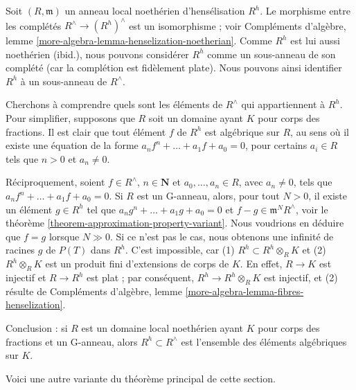\begin{example}
\label{example-describe-henselian}
Soit $(R, \mathfrak m)$ un anneau local noethérien d'hensélisation $R^h$.
Le morphisme entre les complétés $R^\wedge \to (R^h)^\wedge$ est un
isomorphisme ; voir Compléments d'algèbre, lemme
\ref{more-algebra-lemma-henselization-noetherian}.
Comme $R^h$ est lui aussi noethérien (ibid.), nous pouvons considérer $R^h$
comme un sous-anneau de son complété (car la complétion est fidèlement
plate). Nous pouvons ainsi identifier $R^h$ à un sous-anneau de $R^\wedge$.

\medskip\noindent
Cherchons à comprendre quels sont les éléments de $R^\wedge$ qui
appartiennent à $R^h$. Pour simplifier, supposons que $R$ soit un domaine
ayant $K$ pour corps des fractions. Il est clair que tout élément $f$ de $R^h$
est algébrique sur $R$, au sens où il existe une équation de la forme
$a_n f^n + \ldots + a_1 f + a_0 = 0$, pour certains $a_i \in R$ tels que
$n > 0$ et $a_n \not = 0$.

\medskip\noindent
Réciproquement, soient $f \in R^\wedge$, $n \in \mathbf{N}$ et
$a_0, \ldots, a_n \in R$, avec $a_n \not = 0$, tels que
$a_n f^n + \ldots + a_1 f + a_0 = 0$. Si $R$ est un G-anneau, alors, pour
tout $N > 0$, il existe un élément $g \in R^h$ tel que
$a_n g^n + \ldots + a_1 g + a_0 = 0$ et $f - g \in \mathfrak m^N R^\wedge$,
voir le théorème \ref{theorem-approximation-property-variant}.
Nous voudrions en déduire que $f = g$ lorsque $N \gg 0$.
Si ce n'est pas le cas, nous obtenons une infinité de racines $g$ de $P(T)$
dans $R^h$. C'est impossible, car (1) $R^h \subset R^h \otimes_R K$
et (2) $R^h \otimes_R K$ est un produit fini d'extensions de corps de $K$.
En effet, $R \to K$ est injectif et $R \to R^h$ est plat ; par conséquent,
$R^h \to R^h \otimes_R K$ est injectif, et (2) résulte de
Compléments d'algèbre, lemme
\ref{more-algebra-lemma-fibres-henselization}.

\medskip\noindent
Conclusion : si $R$ est un domaine local noethérien ayant $K$ pour corps des
fractions et un G-anneau, alors $R^h \subset R^\wedge$ est l'ensemble des
éléments algébriques sur $K$.
\end{example}

\noindent
Voici une autre variante du théorème principal de cette section.

